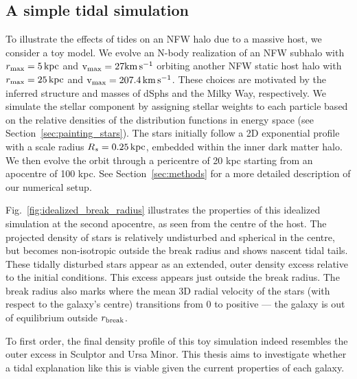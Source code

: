 \subsection{A simple tidal simulation}\label{a-simple-tidal-simulation}

To illustrate the effects of tides on an NFW halo due to a massive host,
we consider a toy model. We evolve an N-body realization of an NFW
subhalo with \(r_{\rm max}=5\,{\rm kpc}\) and \({\rm v}_{\rm max} = 27{\rm km\,s^{-1}}\) orbiting another
NFW static host halo with \(r_{\rm max}=25\,{\rm kpc}\) and
\({\rm v}_{\rm max} = 207.4\,{\rm km\,s^{-1}}\). These choices are motivated by the inferred
structure and masses of dSphs and the Milky Way, respectively. We
simulate the stellar component by assigning stellar weights to each
particle based on the relative densities of the distribution functions
in energy space (see Section~\ref{sec:painting_stars}). The stars
initially follow a 2D exponential profile with a scale radius
\(R_s=0.25\,{\rm kpc}\), embedded within the inner dark matter halo. We then
evolve the orbit through a pericentre of 20 kpc starting from an
apocentre of 100 kpc. See Section~\ref{sec:methods} for a more detailed
description of our numerical setup.

Fig.~\ref{fig:idealized_break_radius} illustrates the properties of this
idealized simulation at the second apocentre, as seen from the centre of
the host. The projected density of stars is relatively undisturbed and
spherical in the centre, but becomes non-isotropic outside the break
radius and shows nascent tidal tails. These tidally disturbed stars
appear as an extended, outer density excess relative to the initial
conditions. This excess appears just outside the break radius. The break
radius also marks where the mean 3D radial velocity of the stars (with
respect to the galaxy's centre) transitions from 0 to positive --- the
galaxy is out of equilibrium outside \(r_{\rm break}\).

To first order, the final density profile of this toy simulation indeed
resembles the outer excess in Sculptor and Ursa Minor. This thesis aims
to investigate whether a tidal explanation like this is viable given the
current properties of each galaxy.

